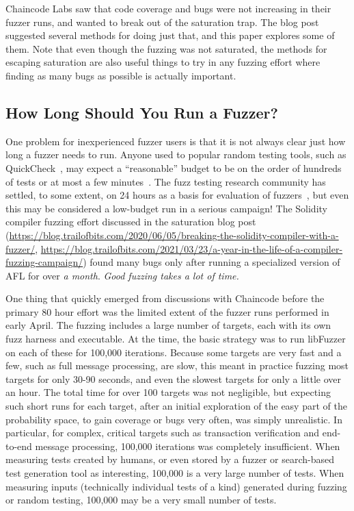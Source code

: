 Chaincode Labs saw that code coverage and bugs were not increasing in their fuzzer runs, and wanted to break out of the saturation trap.  The blog post suggested several methods for doing just that, and this paper explores some of them.  Note that even though the fuzzing was not saturated, the methods for escaping saturation are also useful things to try in any fuzzing effort where finding as many bugs as possible is actually important.

\subsection{How Long Should You Run a Fuzzer?}

\begin{sloppypar}
  One problem for inexperienced fuzzer users is that it is not always clear just how long a fuzzer needs to run.  Anyone used to popular random testing tools, such as QuickCheck~\cite{ClaessenH00}, may expect a ``reasonable'' budget to be on the order of hundreds of tests or at most a few minutes~\cite{HolmesLOC}.  The fuzz testing research community has settled, to some extent, on 24 hours as a basis for evaluation of fuzzers~\cite{evalfuzz}, but even this may be considered a low-budget run in a serious campaign!  The Solidity compiler fuzzing effort discussed in the saturation blog post (\url{https://blog.trailofbits.com/2020/06/05/breaking-the-solidity-compiler-with-a-fuzzer/}, \url{https://blog.trailofbits.com/2021/03/23/a-year-in-the-life-of-a-compiler-fuzzing-campaign/}) found many bugs only after running a specialized version of AFL for over \emph{a month}.   \emph{Good fuzzing takes a lot of time.}
  \end{sloppypar}

One thing that quickly emerged from discussions with Chaincode before the primary 80 hour effort was the limited extent of the fuzzer runs performed in early April.  The fuzzing includes a large number of targets, each with its own fuzz harness and executable.  At the time, the basic strategy was to run libFuzzer on each of these for 100,000 iterations.  Because some targets are very fast and a few, such as full message processing, are slow, this meant in practice fuzzing most targets for only 30-90 seconds, and even the slowest targets for only a little over an hour.  The total time for over 100 targets was not negligible, but expecting such short runs for each target, after an initial exploration of the easy part of the probability space, to gain coverage or bugs very often, was simply unrealistic.  In particular, for complex, critical targets such as transaction verification and end-to-end message processing, 100,000 iterations was completely insufficient.  When measuring tests created by humans, or even stored by a fuzzer or search-based test generation tool as interesting, 100,000 is a very large number of tests.  When measuring inputs (technically individual tests of a kind) generated during fuzzing or random testing, 100,000 may be a very small number of tests.

